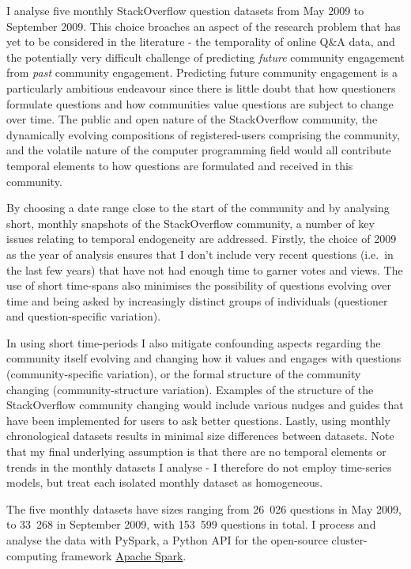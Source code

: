 \documentclass[11pt,preprint, authoryear]{article}
\begin{document}
I analyse five monthly StackOverflow question datasets from May 2009 to
September 2009. This choice broaches an aspect of the research problem
that has yet to be considered in the literature - the temporality of
online Q\&A data, and the potentially very difficult challenge of
predicting \emph{future} community engagement from \emph{past} community
engagement. Predicting future community engagement is a particularly
ambitious endeavour since there is little doubt that how questioners
formulate questions and how communities value questions are subject to
change over time. The public and open nature of the StackOverflow
community, the dynamically evolving compositions of registered-users
comprising the community, and the volatile nature of the computer
programming field would all contribute temporal elements to how
questions are formulated and received in this community.

By choosing a date range close to the start of the community and by
analysing short, monthly snapshots of the StackOverflow community, a
number of key issues relating to temporal endogeneity are addressed.
Firstly, the choice of 2009 as the year of analysis ensures that I don't
include very recent questions (i.e.~in the last few years) that have not
had enough time to garner votes and views. The use of short time-spans
also minimises the possibility of questions evolving over time and being
asked by increasingly distinct groups of individuals (questioner and
question-specific variation).

In using short time-periods I also mitigate confounding aspects
regarding the community itself evolving and changing how it values and
engages with questions (community-specific variation), or the formal
structure of the community changing (community-structure variation).
Examples of the structure of the StackOverflow community changing would
include various nudges and guides that have been implemented for users
to ask better questions. Lastly, using monthly chronological datasets
results in minimal size differences between datasets. Note that my final
underlying assumption is that there are no temporal elements or trends
in the monthly datasets I analyse - I therefore do not employ
time-series models, but treat each isolated monthly dataset as
homogeneous.

The five monthly datasets have sizes ranging from 26~026 questions in
May 2009, to 33~268 in September 2009, with 153~599 questions in total.
I process and analyse the data with PySpark, a Python API for the
open-source cluster-computing framework
\href{http://spark.apache.org}{Apache Spark}.
\end{document}
